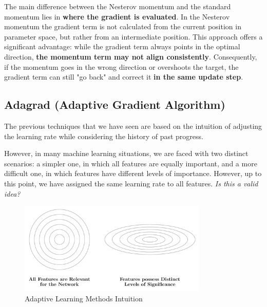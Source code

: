 The main difference between the Nesterov momentum and the standard momentum lies in \textbf{where the gradient is evaluated}. In the Nesterov momentum the gradient term is not calculated from the current position in parameter space, but rather from an intermediate position. This approach offers a significant advantage: while the gradient term always points in the optimal direction, \textbf{the momentum term may not align consistently}. Consequently, if the momentum goes in the wrong direction or overshoots the target, the gradient term can still "go back" and correct it \textbf{in the same update step}.

\newpage
\subsection{Adagrad (Adaptive Gradient Algorithm)}
The previous techniques that we have seen are based on the intuition of adjusting the learning rate while considering the history of past progress.

However, in many machine learning situations, we are faced with two distinct scenarios: a simpler one, in which all features are equally important, and a more difficult one, in which features have different levels of importance. However, up to this point, we have assigned the same learning rate to all features. \textit{Is this a valid idea?}

\begin{figure}[htbp]
\centering
\includegraphics[width=0.8\textwidth]{tikz/chapter3 - Features Importance.pdf}
\caption{Adaptive Learning Methods Intuition}
\end{figure}

